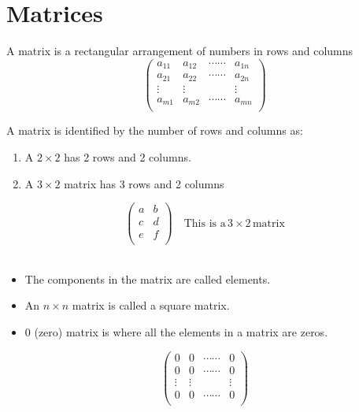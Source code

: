 \documentclass[11pt,a4paper]{article}
\theoremstyle{definition}
\begin{document}
\pagebreak
\section{Matrices}
A matrix is a rectangular arrangement of numbers in rows and columns\\
$$
\begin{pmatrix}
a_{11} & a_{12} & \cdots \cdots & a_{1n}\\
a_{21} & a_{22} & \cdots \cdots & a_{2n}\\
\vdots & \vdots & & \vdots \\
a_{m1} & a_{m2} &  \cdots \cdots & a_{mn}\\
\end{pmatrix}
$$

A  matrix is identified by the number of rows and columns as:\\
\begin{enumerate}
\item[] A $2\times 2$ has 2 rows and 2 columns.
\item[]  A $3\times 2$ matrix has 3 rows and 2 columns
\end{enumerate}


$$
\begin{pmatrix}
a&b\\
c&d\\
e&f\\
\end{pmatrix}
\quad  \text{This is a} \, 3\times 2 \, \text{matrix}$$\\

\begin{itemize}
\item The components in the matrix are called elements.
\item An $n\times n$ matrix is called a square matrix.
\item 0 (zero) matrix is where all the elements in a matrix are zeros.
\end{itemize}


\[
\begin{pmatrix}
0 & 0 & \cdots \cdots & 0\\
0 & 0 & \cdots \cdots & 0\\
\vdots & \vdots && \vdots \\
0 & 0 & \cdots \cdots & 0\\
\end{pmatrix}
\]

\vspace{0.2cm}
\end{document}
